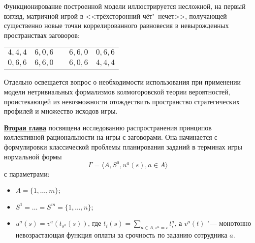 Функционирование построенной модели иллюстрируется несложной, на первый взгляд, матричной игрой в <<трёхсторонний чёт"~нечет>>, получающей существенно новые точки коррелированного равновесия в невырожденных пространствах заговоров:
\begin{table} [htbp]
	\centering
	\captionsetup{labelformat=empty}
	\begin{threeparttable}
		\begin{tabular}{ |c|c|c|c|c| }
			\cline{1-2} \cline{4-5}
			\rule[-7pt]{0pt}{2em}$4, 4, 4$ &
			\rule[-7pt]{0pt}{2em}$6, 0, 6$ & \qquad\qquad\qquad &
			\rule[-7pt]{0pt}{2em}$6, 6, 0$ &
			\rule[-7pt]{0pt}{2em}$0, 6, 6$ \\
			\cline{1-2} \cline{4-5}
			\rule[-7pt]{0pt}{2em}$0, 6, 6$ &
			\rule[-7pt]{0pt}{2em}$6, 6, 0$ & \qquad\qquad\qquad &
			\rule[-7pt]{0pt}{2em}$6, 0, 6$ &
			\rule[-7pt]{0pt}{2em}$4, 4, 4$ \\
			\cline{1-2} \cline{4-5}
		\end{tabular}
	\end{threeparttable}
\end{table}

Отдельно освещается вопрос о необходимости использования при применении модели нетривиальных формализмов колмогоровской теории вероятностей, проистекающей из невозможности отождествить пространство стратегических профилей и множество исходов игры.

\underline{\textbf{Вторая глава}} посвящена исследованию распространения принципов коллективной рациональности на игры с заговорами. Она начинается с формулировки классической проблемы планирования заданий в терминах игры нормальной формы
\begin{equation*}
	\Gamma = \langle A, S^a, u^a(s), a \in A \rangle
\end{equation*}
с параметрами:
\begin{itemize}
	\item $A = \{ 1, \ldots, m \}$;
	\item $S^1 = \ldots = S^m = \{ 1, \ldots, n \}$;
	\item $u^a(s) = v^a(t_{s^a}(s))$, где $t_i(s) = \sum\limits_{a \in A, s^a = i} t_i^a$, а $v^a(t)$ "--- монотонно невозрастающая функция оплаты за срочность по заданию сотрудника $a$.
\end{itemize}

